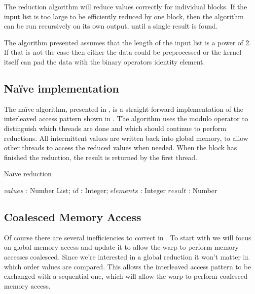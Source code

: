 The reduction algorithm will reduce values correctly for individual
blocks. If the input list is too large to be efficiently reduced by
one block, then the algorithm can be run recursively on its own
output, until a single result is found.

The algorithm presented assumes that the length of the input list is a
power of 2. If that is not the case then either the data could be
preprocessed or the kernel itself can pad the data with the binary
operators identity element.

\subsection{Naïve implementation}

The naïve algorithm, presented in , is a
straight forward implementation of the interleaved access pattern
shown in . The algorithm uses the modulo operator
to distinguish which threads are done and which should continue to
perform reductions. All intermittent values are written back into
global memory, to allow other threads to access the reduced values
when needed. When the block has finished the reduction, the result
is returned by the first thread.

\begin{algorithm}
  \caption{Naïve reduction}
  \label{alg:naiveReduct}
  \begin{algorithmic}
              {$values$ : Number List; $id$ : Integer; $elements$ : Integer}
              {$result$ : Number}
              {
                  \ENDIF
                  \SYNC
                \ENDWHILE
                \ENDIF
              }
  \end{algorithmic}
\end{algorithm}

\subsection{Coalesced Memory Access}

Of course there are several inefficiencies to correct in
. To start with we will focus on global memory
access and update it to allow the warp to perform memory accesses
coalesced. Since we're interested in a global reduction it won't
matter in which order values are compared. This allows the interleaved
access pattern to be exchanged with a sequential one, which will
allow the warp to perform coalesced memory access.

